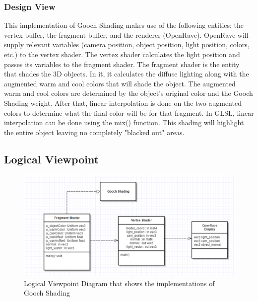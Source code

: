 \documentclass[10pt,journal,compsoc,draftclsnofoot]{IEEEtran}
\begin{document}
\begin{flushleft}
\subsubsection{Design View}
This implementation of Gooch Shading makes use of the following entities: the vertex buffer, the fragment buffer, and the renderer (OpenRave). 
OpenRave will supply relevant variables (camera position, object position, light position, colors, etc.) to the vertex shader.
The vertex shader calculates the light position and passes its variables to the fragment shader.
The fragment shader is the entity that shades the 3D objects.
In it, it calculates the diffuse lighting along with the augmented warm and cool colors that will shade the object.
The augmented warm and cool colors are determined by the object's original color and the Gooch Shading weight.
After that, linear interpolation is done on the two augmented colors to determine what the final color will be for that fragment.
In GLSL, linear interpolation can be done using the mix() function.
This shading will highlight the entire object leaving no completely "blacked out" areas.

\newpage

\subsection{Logical Viewpoint}

\begin{figure} [H]
  \includegraphics[scale=0.8]{Gooch_Shading_composition.eps}
  \caption
{ \newline \hspace{\linewidth}
Logical Viewpoint Diagram that shows the implementations of Gooch Shading}
  \label{fig:Gooch_Shading_composition}
\end{figure}


\end{flushleft}
\end{document}
